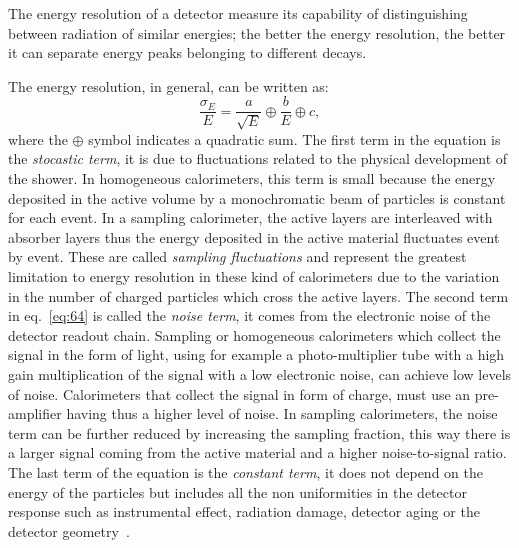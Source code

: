 The energy resolution of a detector measure its capability of distinguishing
between radiation of similar energies; the better the energy resolution, the
better it can separate energy peaks belonging to different decays.

The energy resolution, in general, can be written as:
\begin{equation}
  \label{eq:64}
  \frac{\sigma_E}{E} = \frac{a}{\sqrt{E}} \oplus \frac{b}{E} \oplus c,
\end{equation}
where the $\oplus$ symbol indicates a quadratic sum. The first term in the
equation is the \emph{stocastic term}, it is due to fluctuations related to the
physical development of the shower. In homogeneous calorimeters, this term is
small because the energy deposited in the active volume by a monochromatic beam
of particles is constant for each event. In a sampling calorimeter, the active
layers are interleaved with absorber layers thus the energy deposited in the
active material fluctuates event by event. These are called \emph{sampling
  fluctuations} and represent the greatest limitation to energy resolution in
these kind of calorimeters due to the variation in the number of charged
particles which cross the active layers. The second term in eq.~\eqref{eq:64} is
called the \emph{noise term}, it comes from the electronic noise of the detector
readout chain. Sampling or homogeneous calorimeters which collect the signal in
the form of light, using for example a photo-multiplier tube with a high gain
multiplication of the signal with a low electronic noise, can achieve low levels
of noise. Calorimeters that collect the signal in form of charge, must use an
pre-amplifier having thus a higher level of noise. In sampling calorimeters, the
noise term can be further reduced by increasing the sampling fraction, this way
there is a larger signal coming from the active material and a higher
noise-to-signal ratio. The last term of the equation is the \emph{constant
  term}, it does not depend on the energy of the particles but includes all the
non uniformities in the detector response such as instrumental effect, radiation
damage, detector aging or the detector geometry~\cite{Calorimetry}.
